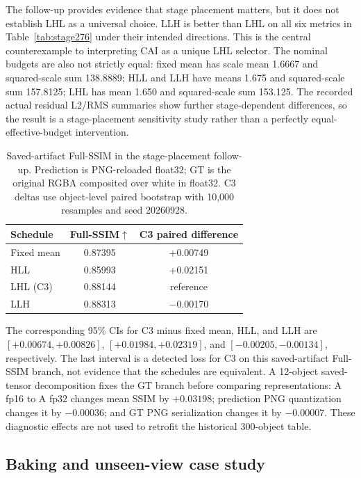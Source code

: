 \documentclass[times,twocolumn,final]{elsarticle}
\begin{document}
The follow-up provides evidence that stage placement matters, but it does not
establish LHL as a universal choice. LLH is better than LHL on all six metrics in
Table~\ref{tab:stage276} under their intended directions. This is the central
counterexample to interpreting CAI as a unique LHL selector. The nominal
budgets are also not strictly equal: fixed mean has scale mean 1.6667 and
squared-scale sum 138.8889; HLL and LLH have means 1.675 and squared-scale
sum 157.8125; LHL has mean 1.650 and squared-scale sum 153.125. The recorded
actual residual L2/RMS summaries show further stage-dependent differences, so
the result is a stage-placement sensitivity study rather than a perfectly
equal-effective-budget intervention.

\begin{table}[t]
\centering
\caption{Saved-artifact Full-SSIM in the stage-placement follow-up. Prediction is PNG-reloaded float32; GT is the original RGBA composited over white in float32. C3 deltas use object-level paired bootstrap with 10,000 resamples and seed 20260928.}
\label{tab:serialized276}
\small
\begin{tabular}{lcc}
\toprule
Schedule & Full-SSIM$\uparrow$ & C3 paired difference \\
\midrule
Fixed mean & 0.87395 & +0.00749 \\
HLL & 0.85993 & +0.02151 \\
LHL (C3) & 0.88144 & reference \\
LLH & 0.88313 & $-$0.00170 \\
\bottomrule
\end{tabular}
\end{table}

The corresponding 95\% CIs for C3 minus fixed mean, HLL, and LLH are
$[+0.00674,+0.00826]$, $[+0.01984,+0.02319]$, and
$[-0.00205,-0.00134]$, respectively. The last interval is a detected loss for
C3 on this saved-artifact Full-SSIM branch, not evidence that the schedules
are equivalent. A 12-object saved-tensor decomposition fixes the GT branch
before comparing representations: A fp16 to A fp32 changes mean SSIM by
$+0.03198$; prediction PNG quantization changes it by $-0.00036$; and GT PNG
serialization changes it by $-0.00007$. These diagnostic effects are not used
to retrofit the historical 300-object table.

\FloatBarrier

\subsection{Baking and unseen-view case study}
\label{subsec:baking}
\end{document}
